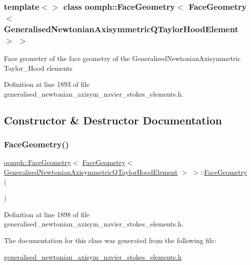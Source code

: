 \subsubsection*{template$<$$>$\newline
class oomph\+::\+Face\+Geometry$<$ Face\+Geometry$<$ Generalised\+Newtonian\+Axisymmetric\+Q\+Taylor\+Hood\+Element $>$ $>$}

Face geometry of the face geometry of the Generalised\+Newtonian\+Axisymmetric Taylor\+\_\+\+Hood elements 

Definition at line 1893 of file generalised\+\_\+newtonian\+\_\+axisym\+\_\+navier\+\_\+stokes\+\_\+elements.\+h.



\subsection{Constructor \& Destructor Documentation}
\mbox{\label{classoomph_1_1FaceGeometry_3_01FaceGeometry_3_01GeneralisedNewtonianAxisymmetricQTaylorHoodElement_01_4_01_4_a66f4e14c0a04313425d2460300d828fe}} 
\subsubsection{\texorpdfstring{Face\+Geometry()}{FaceGeometry()}}
{\footnotesize\ttfamily \hyperlink{classoomph_1_1FaceGeometry}{oomph\+::\+Face\+Geometry}$<$ \hyperlink{classoomph_1_1FaceGeometry}{Face\+Geometry}$<$ \hyperlink{classoomph_1_1GeneralisedNewtonianAxisymmetricQTaylorHoodElement}{Generalised\+Newtonian\+Axisymmetric\+Q\+Taylor\+Hood\+Element} $>$ $>$\+::\hyperlink{classoomph_1_1FaceGeometry}{Face\+Geometry} (\begin{DoxyParamCaption}{ }\end{DoxyParamCaption})\hspace{0.3cm}{\ttfamily [inline]}}



Definition at line 1898 of file generalised\+\_\+newtonian\+\_\+axisym\+\_\+navier\+\_\+stokes\+\_\+elements.\+h.



The documentation for this class was generated from the following file\+:\begin{DoxyCompactItemize}
\item 
\hyperlink{generalised__newtonian__axisym__navier__stokes__elements_8h}{generalised\+\_\+newtonian\+\_\+axisym\+\_\+navier\+\_\+stokes\+\_\+elements.\+h}\end{DoxyCompactItemize}
